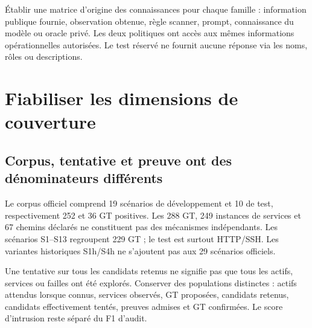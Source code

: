 \documentclass[11pt,a4paper]{article}
\begin{document}
Établir une matrice d'origine des connaissances pour chaque famille :
information publique fournie, observation obtenue, règle scanner, prompt,
connaissance du modèle ou oracle privé. Les deux politiques ont accès aux mêmes
informations opérationnelles autorisées. Le test réservé ne fournit aucune
réponse via les noms, rôles ou descriptions.

\section{Fiabiliser les dimensions de couverture}
\subsection{Corpus, tentative et preuve ont des dénominateurs différents}
Le corpus officiel comprend 19 scénarios de développement et 10 de test,
respectivement 252 et 36 GT positives. Les 288 GT, 249 instances de services et
67 chemins déclarés ne constituent pas des mécanismes indépendants. Les
scénarios S1--S13 regroupent 229 GT ; le test est surtout HTTP/SSH. Les variantes
historiques S1h/S4h ne s'ajoutent pas aux 29 scénarios officiels.

Une tentative sur tous les candidats retenus ne signifie pas que tous les actifs,
services ou failles ont été explorés. Conserver des populations distinctes :
actifs attendus lorsque connus, services observés, GT proposées, candidats
retenus, candidats effectivement tentés, preuves admises et GT confirmées.
Le score d'intrusion reste séparé du F1 d'audit.
\end{document}
